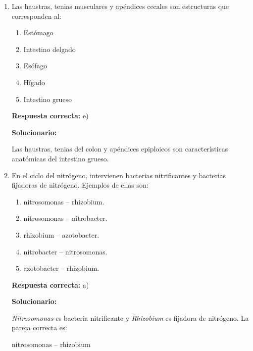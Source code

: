 \begin{enumerate}[resume]
	\vspace{2mm}
	\textbf{Solucionario:}
	
	En los ovovivíparos, los huevos permanecen dentro del cuerpo de la madre hasta su eclosión, pero el embrión se nutre del huevo, no directamente de la madre.
	
	\vspace{6mm}
	
	\item Las haustras, tenias musculares y apéndices cecales son estructuras que corresponden al:
	\begin{enumerate}[label=\alph*)]
		\item Estómago
		\item Intestino delgado
		\item Esófago
		\item Hígado
		\item Intestino grueso
	\end{enumerate}
	\textbf{Respuesta correcta:} e)
	
	\vspace{2mm}
	\textbf{Solucionario:}
	
	Las haustras, tenias del colon y apéndices epiploicos son características anatómicas del intestino grueso.
	
	\vspace{6mm}
	
	\item En el ciclo del nitrógeno, intervienen bacterias nitrificantes y bacterias fijadoras de nitrógeno. Ejemplos de ellas son:
	\begin{enumerate}[label=\alph*)]
		\item nitrosomonas -- rhizobium.
		\item nitrosomonas -- nitrobacter.
		\item rhizobium -- azotobacter.
		\item nitrobacter -- nitrosomonas.
		\item azotobacter -- rhizobium.
	\end{enumerate}
	\textbf{Respuesta correcta:} a)
	
	\vspace{2mm}
	\textbf{Solucionario:}
	
	\textit{Nitrosomonas} es bacteria nitrificante y \textit{Rhizobium} es fijadora de nitrógeno. La pareja correcta es:
	
	$\text{nitrosomonas -- rhizobium}$
	
	\vspace{6mm}
	

\end{enumerate}
